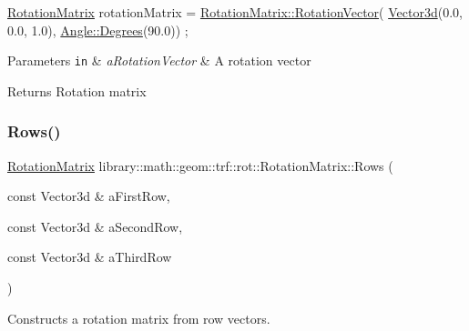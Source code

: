 \begin{DoxyCode}
\hyperlink{classlibrary_1_1math_1_1geom_1_1trf_1_1rot_1_1_rotation_matrix_a667d2c05aa5b0cc88775938d11164cdc}{RotationMatrix} rotationMatrix = \hyperlink{classlibrary_1_1math_1_1geom_1_1trf_1_1rot_1_1_rotation_matrix_aeace0bbd2b718443514a5f10aca3a904}{RotationMatrix::RotationVector}(
      \hyperlink{namespacelibrary_1_1math_1_1obj_a977e84e9bf317a4e7dd9d6d671d6da2f}{Vector3d}(0.0, 0.0, 1.0), \hyperlink{classlibrary_1_1math_1_1geom_1_1_angle_a64aa53e8420aeb6f671d86c65c370bc8}{Angle::Degrees}(90.0)) ;
\end{DoxyCode}



\begin{DoxyParams}[1]{Parameters}
\mbox{\tt in}  & {\em a\+Rotation\+Vector} & A rotation vector \\
\hline
\end{DoxyParams}
\begin{DoxyReturn}{Returns}
Rotation matrix 
\end{DoxyReturn}
\mbox{\label{classlibrary_1_1math_1_1geom_1_1trf_1_1rot_1_1_rotation_matrix_a25edc11452f7979746bed675e662eb2c}} 
\subsubsection{\texorpdfstring{Rows()}{Rows()}}
{\footnotesize\ttfamily \hyperlink{classlibrary_1_1math_1_1geom_1_1trf_1_1rot_1_1_rotation_matrix}{Rotation\+Matrix} library\+::math\+::geom\+::trf\+::rot\+::\+Rotation\+Matrix\+::\+Rows (\begin{DoxyParamCaption}\item[{const Vector3d \&}]{a\+First\+Row,  }\item[{const Vector3d \&}]{a\+Second\+Row,  }\item[{const Vector3d \&}]{a\+Third\+Row }\end{DoxyParamCaption})\hspace{0.3cm}{\ttfamily [static]}}



Constructs a rotation matrix from row vectors. 


